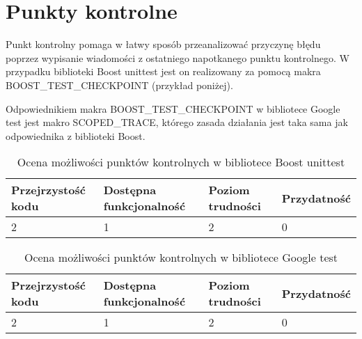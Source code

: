 \documentclass[12pt,a4paper,notitlepage]{report}
\begin{document}
\section{Punkty kontrolne}

Punkt kontrolny pomaga w łatwy sposób przeanalizować przyczynę błędu poprzez wypisanie wiadomości z ostatniego napotkanego punktu kontrolnego. W przypadku biblioteki Boost unittest jest on realizowany za pomocą makra BOOST{\_}TEST{\_}CHECKPOINT (przykład poniżej).

			

Odpowiednikiem makra BOOST{\_}TEST{\_}CHECKPOINT w bibliotece Google test jest makro SCOPED{\_}TRACE, którego zasada działania jest taka sama jak odpowiednika z biblioteki Boost.

			

\begin{center}
			\begin{table}[!ht]
			\caption{Ocena możliwości punktów kontrolnych w bibliotece Boost unittest}
			\label{}
			\begin{tabular}[!hc]{|l|l|l|l|}
		\hline
		Przejrzystość kodu 	&	Dostępna funkcjonalność	&	Poziom trudności	&	Przydatność \\ \hline
		2					&	1						&	2					& 	0  			\\ \hline
			\end{tabular}
			\end{table} 
		\end{center}


\begin{center}
			\begin{table}[!ht]
			\caption{Ocena możliwości punktów kontrolnych w bibliotece Google test}
			\label{}
			\begin{tabular}[!hc]{|l|l|l|l|}
		\hline
		Przejrzystość kodu 	&	Dostępna funkcjonalność	&	Poziom trudności	&	Przydatność \\ \hline
		2					&	1						&	2					& 	0  			\\ \hline
			\end{tabular}
			\end{table} 
		\end{center}
\end{document}

